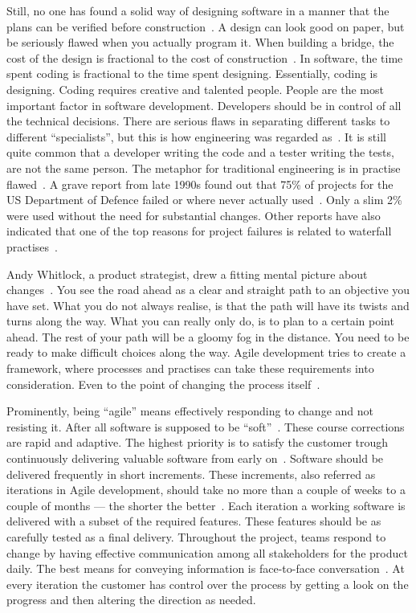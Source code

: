 \documentclass[english]{tktltiki2}
\begin{document}
Still, no one has found a solid way of designing software in a manner that the plans can be verified before construction~\cite{Fow05}. A design can look good on paper, but be seriously flawed when you actually program it. When building a bridge, the cost of the design is fractional to the cost of construction~\cite{Fow05}. In software, the time spent coding is fractional to the time spent designing. Essentially, coding is designing. Coding requires creative and talented people. People are the most important factor in software development. Developers should be in control of all the technical decisions. There are serious flaws in separating different tasks to different “specialists”, but this is how engineering was regarded as~\cite{Roy70}. It is still quite common that a developer writing the code and a tester writing the tests, are not the same person. The metaphor for traditional engineering is in practise flawed~\cite{Fow05}. A grave report from late 1990s found out that 75\% of projects for the US Department of Defence failed or where never actually used~\cite{LB03}. Only a slim 2\% were used without the need for substantial changes. Other reports have also indicated that one of the top reasons for project failures is related to waterfall practises~\cite{LB03}.

Andy Whitlock, a product strategist, drew a fitting mental picture about changes~\cite{Whi14}. You see the road ahead as a clear and straight path to an objective you have set. What you do not always realise, is that the path will have its twists and turns along the way. What you can really only do, is to plan to a certain point ahead. The rest of your path will be a gloomy fog in the distance. You need to be ready to make difficult choices along the way. Agile development tries to create a framework, where processes and practises can take these requirements into consideration. Even to the point of changing the process itself~\cite{Fow05}.

Prominently, being “agile” means effectively responding to change and not resisting it. After all software is supposed to be “soft”~\cite{Fow05}. These course corrections are rapid and adaptive. The highest priority is to satisfy the customer trough continuously delivering valuable software from early on~\cite{BBB01b}. Software should be delivered frequently in short increments. These increments, also referred as iterations in Agile development, should take no more than a couple of weeks to a couple of months — the shorter the better~\cite{Fow05}. Each iteration a working software is delivered with a subset of the required features. These features should be as carefully tested as a final delivery. Throughout the project, teams respond to change by having effective communication among all stakeholders for the product daily. The best means for conveying information is face-to-face conversation~\cite{BBB01b}. At every iteration the customer has control over the process by getting a look on the progress and then altering the direction as needed.
\end{document}
